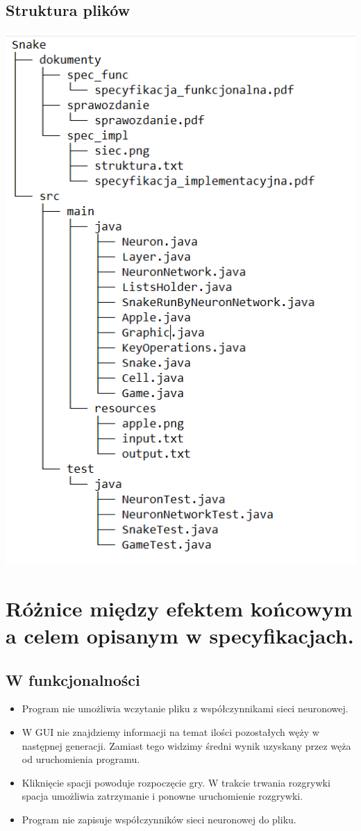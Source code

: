 \documentclass{article}
\begin{document}
    \subsection{Struktura plików}
        \includegraphics[scale = 2.2]{struktura}
\section{Różnice między efektem końcowym a celem opisanym w specyfikacjach.}
    \subsection{W funkcjonalności}
        \begin{itemize}
            \item Program nie umożliwia wczytanie pliku z współczynnikami sieci neuronowej.
            \item W GUI nie znajdziemy informacji na temat ilości pozostałych węży w następnej generacji. Zamiast tego widzimy średni wynik uzyskany przez węża od uruchomienia programu.
            \item Kliknięcie spacji powoduje rozpoczęcie gry. W trakcie trwania rozgrywki spacja umożliwia zatrzymanie i ponowne uruchomienie rozgrywki.
            \item Program nie zapisuje współczynników sieci neuronowej do pliku.
        \end{itemize}
\end{document}
